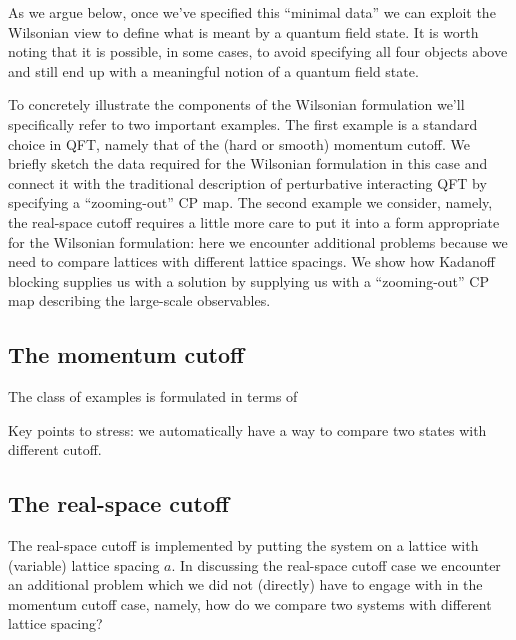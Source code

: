 \documentclass[11pt]{amsart}
\theoremstyle{plain}%
\theoremstyle{definition}
\theoremstyle{remark}
\begin{document}
As we argue below, once we've specified this ``minimal data'' we can exploit the Wilsonian view to define what is meant by a quantum field state. It is worth noting that it is possible, in some cases, to avoid specifying all four objects above and still end up with a meaningful notion of a quantum field state.

To concretely illustrate the components of the Wilsonian formulation we'll specifically refer to two important examples. The first example is a standard choice in QFT, namely that of the (hard or smooth) momentum cutoff. We briefly sketch the data required for the Wilsonian formulation in this case and connect it with the traditional description of perturbative interacting QFT by specifying a ``zooming-out'' CP map. The second example we consider, namely, the real-space cutoff requires a little more care to put it into a form appropriate for the Wilsonian formulation: here we encounter additional problems because we need to compare lattices with different lattice spacings. We show how Kadanoff blocking supplies us with a solution by supplying us with a ``zooming-out'' CP map describing the large-scale observables. 

\subsection{The momentum cutoff}
The class of examples is formulated in terms of

Key points to stress: we automatically have a way to compare two states with different cutoff.

\subsection{The real-space cutoff}
The real-space cutoff is implemented by putting the system on a lattice with (variable) lattice spacing $a$. In discussing the real-space cutoff case we encounter an additional problem which we did not (directly) have to engage with in the momentum cutoff case, namely, how do we compare two systems with different lattice spacing? 
\end{document}
